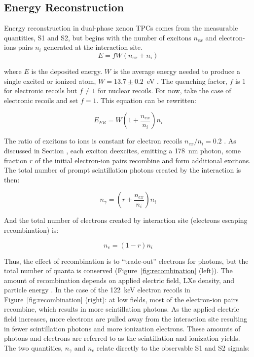 \subsection{Energy Reconstruction}
Energy reconstruction in dual-phase xenon \ac{TPC}s comes from the measurable quantities, S1 and S2, but begins with the number of excitons $n_{ex}$  and electron-ions pairs $n_{i}$ generated at the interaction site. 
\begin{equation}
E = f W (n_{ex} + n_{i} )
\end{equation}

where $E$ is the deposited energy. $W$ is the average energy needed to produce a single excited or ionized atom, $W = 13.7 \pm 0.2$~eV \cite{Mock2014}. The quenching factor, $f$ is 1 for electronic recoils but $f \neq 1$ for nuclear recoils. For now, take the case of electronic recoils and set $f=1$. This equation can be rewritten:

\begin{equation}
E_{ER} = W (1 + \frac{n_{ex}}{n_{i}} ) n_{i}
\end{equation}

The ratio of excitons to ions is constant for electron recoils $n_{ex}/{n_{i}} = 0.2$ \cite{LUX:YieldsAndRecombination}. As discussed in Section \label{sec:signal_generation}, each exciton deexcites, emitting a 178~nm photon, some fraction $r$ of the initial electron-ion pairs recombine and form additional excitons. The total number of prompt scintillation photons created by the interaction is then:

\begin{equation}
n_{\gamma} = (r + \frac{n_{ex}}{n_{i}} ) n_{i}
\end{equation}

And the total number of electrons created by interaction site (electrons escaping recombination) is:

\begin{equation}
n_{e} = (1 - r ) n_{i}
\end{equation}

Thus, the effect of recombination is to ``trade-out'' electrons for photons, but the total number of quanta is conserved (Figure~\ref{fig:recombination} (left)). The amount of recombination depends on applied electric field, \ac{LXe} density, and particle energy \cite{LUX:YieldsAndRecombination}. In the case of the 122~keV electron recoils in Figure~\ref{fig:recombination} (right): at low fields, most of the electron-ion pairs recombine, which results in more scintillation photons. As the applied electric field increases, more electrons are pulled away from the interaction site resulting in fewer scintillation photons and more ionization electrons. These amounts of photons and electrons are referred to as the scintillation and ionization yields. The two quantities, $n_{\gamma}$  and $n_{e}$ relate directly to the observable S1 and S2 signals:

